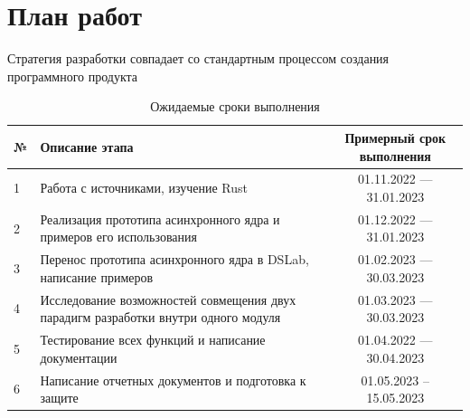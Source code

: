 \section{План работ}

Стратегия разработки совпадает со стандартным процессом создания программного продукта 

\begin{table}[!h]
	\centering
\begin{tabular}{|l|p{27em}|c|}
	\hline
№	& Описание этапа &  Примерный срок выполнения \\
	\hline
	1 & Работа с источниками, изучение Rust &  01.11.2022 --- 31.01.2023\\ 
	\hline
2 & Реализация прототипа асинхронного ядра и примеров его использования & 01.12.2022 --- 31.01.2023 \\
	\hline
3	& Перенос прототипа асинхронного ядра в DSLab, написание примеров &  01.02.2023 --- 30.03.2023 \\
\hline
4	& Исследование возможностей совмещения двух парадигм разработки внутри одного модуля &  01.03.2023 --- 30.03.2023 \\
	\hline
5	& Тестирование всех функций и написание документации &  01.04.2022 --- 30.04.2023  \\
	\hline
6	& Написание отчетных документов и подготовка к защите & 01.05.2023 -- 15.05.2023 \\
	\hline
\end{tabular}
	\caption{Ожидаемые сроки выполнения}
	\label{table1}
\end{table}
